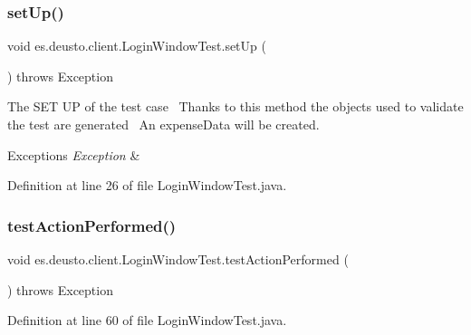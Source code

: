 \subsubsection{\texorpdfstring{set\+Up()}{setUp()}}
{\footnotesize\ttfamily void es.\+deusto.\+client.\+Login\+Window\+Test.\+set\+Up (\begin{DoxyParamCaption}{ }\end{DoxyParamCaption}) throws Exception}

The S\+ET UP of the test case~\newline
Thanks to this method the objects used to validate the test are generated~\newline
An expense\+Data will be created. 
\begin{DoxyExceptions}{Exceptions}
{\em Exception} & \\
\hline
\end{DoxyExceptions}


Definition at line 26 of file Login\+Window\+Test.\+java.

\mbox{\label{classes_1_1deusto_1_1client_1_1_login_window_test_a404ca444c6d5f9e57ddd9999e4f0c982}} 
\subsubsection{\texorpdfstring{test\+Action\+Performed()}{testActionPerformed()}}
{\footnotesize\ttfamily void es.\+deusto.\+client.\+Login\+Window\+Test.\+test\+Action\+Performed (\begin{DoxyParamCaption}{ }\end{DoxyParamCaption}) throws Exception}



Definition at line 60 of file Login\+Window\+Test.\+java.

\mbox{\label{classes_1_1deusto_1_1client_1_1_login_window_test_ac359eac8035197bd00b65f34d5e74c29}} 
